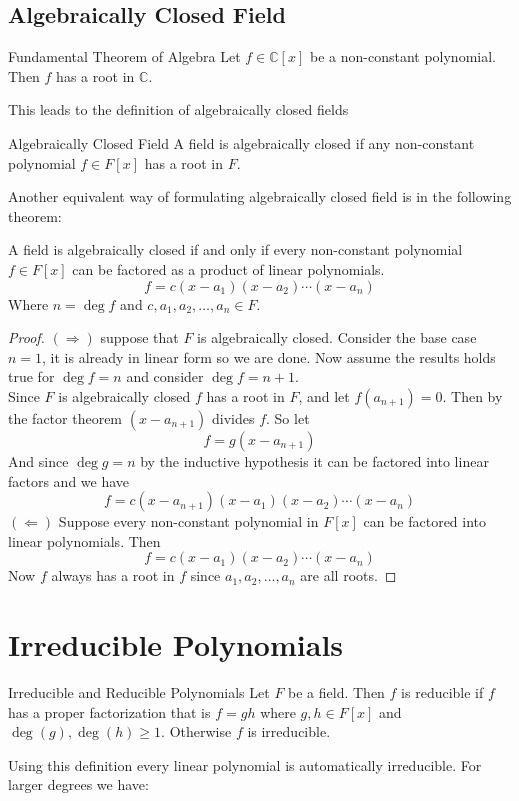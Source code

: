 \documentclass[16pt,a4paper]{article}
\theoremstyle{definition}
\newcommand{\C}{\mathbb{C}}
\begin{document}
\subsection{Algebraically Closed Field}
\begin{thm}{Fundamental Theorem of Algebra}{}
Let $f\in \C[x]$ be a non-constant polynomial. Then $f$ has a root in $\C$. 
\end{thm}
This leads to the definition of algebraically closed fields

\begin{defn}{Algebraically Closed Field}{}
A field is algebraically closed if any non-constant polynomial $f\in F[x]$ has a root in $F$. 
\end{defn} 
 \newpage
Another equivalent way of formulating algebraically closed field is in the following theorem: 

\begin{thm}{}{}
A field is algebraically closed if and only if every non-constant polynomial $f\in F[x]$ can be factored as a product of linear polynomials. 
\[
f = c(x-a_1)(x-a_2) \cdots (x-a_n)
\]
Where $n=\deg f$ and $c,a_1,a_2,\ldots, a_n \in F$. 
\end{thm}

\begin{proof}
$(\Rightarrow)$ suppose that $F$ is algebraically closed. Consider the base case $n=1$, it is already in linear form so we are done. Now assume the results holds true for $\deg f = n$ and consider $\deg f = n+1$. 
\\
Since $F$ is algebraically closed $f$ has a root in $F$, and let $f(a_{n+1}) = 0$. Then by the factor theorem $(x-a_{n+1})$ divides $f$. So let 
\[
f = g(x-a_{n+1})
\] 
And since $\deg g = n$ by the inductive hypothesis it can be factored into linear factors and we have 
\[
f = c(x-a_{n+1})(x-a_1)(x-a_2) \cdots (x-a_n)
\] 
$(\Leftarrow)$ Suppose every non-constant polynomial in $F[x]$ can be factored into linear polynomials. Then 
\[
f = c(x-a_1)(x-a_2) \cdots (x-a_n)
\] 
Now $f$ always has a root in $f$ since $a_1, a_2, \ldots, a_n$ are all roots. 
\end{proof}
\newpage
\section{Irreducible Polynomials}

\begin{defn}{Irreducible and Reducible Polynomials}{}
Let $F$ be a field. Then $f$ is reducible if $f$ has a proper factorization that is $f=gh$ where $g,h\in F[x]$ and $\deg(g),\deg(h) \geq 1$. Otherwise $f$ is irreducible. 
\end{defn}
Using this definition every linear polynomial is automatically irreducible. For larger degrees we have:
\end{document}
